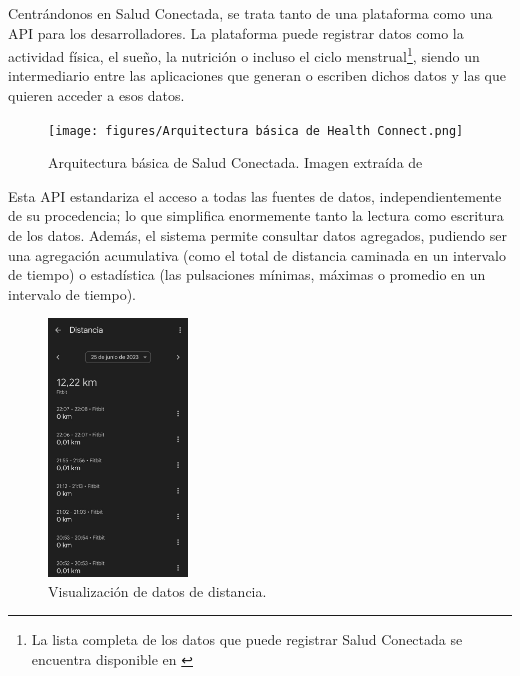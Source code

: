             Centrándonos en Salud Conectada, se trata tanto de una plataforma como una API para los desarrolladores.
            La plataforma puede registrar datos como la actividad física, el sueño, la nutrición o incluso el ciclo
            menstrual\footnote{La lista completa de los datos que puede registrar Salud Conectada se encuentra 
            disponible en \cite{noauthor_lista_nodate}}, siendo un intermediario entre las aplicaciones que generan 
            o escriben dichos datos y las que quieren acceder a esos datos. 
            \begin{figure}[h]
                \centering
                \texttt{[image: figures/Arquitectura básica de Health Connect.png]}
                \caption[Arquitectura básica de Salud Conectada.]
                {Arquitectura básica de  Salud Conectada. Imagen extraída de \cite{wilk_introducing_2022}}
                \label{figure:health_connect:arquitectura}
            \end{figure}

            Esta API estandariza el acceso a todas las fuentes de datos, independientemente de su procedencia; lo que
            simplifica enormemente tanto la lectura como escritura de los datos. Además, el sistema permite consultar
            datos agregados, pudiendo ser una agregación acumulativa (como el total de distancia caminada en un 
            intervalo de tiempo) o estadística (las pulsaciones mínimas, máximas o promedio en un intervalo de tiempo).

            \begin{figure}[h]
                \centering
                \includegraphics[width=0.33\textwidth]{figures/Health Connect lectura datos.jpg}
                \caption[Visualización de datos de distancia.]
                {Visualización de datos de distancia.}
                \label{figure:health_connect:visualizacion_datos}
            \end{figure}
            
